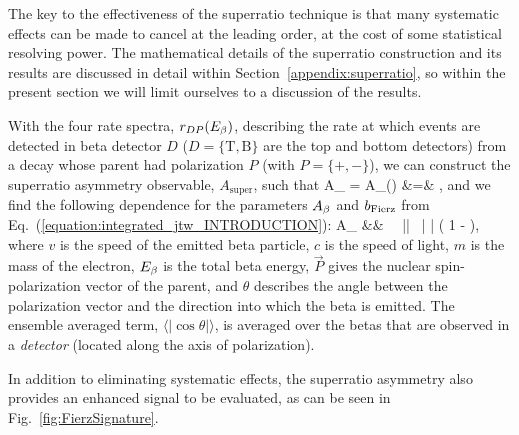 The key to the effectiveness of the superratio technique is that many systematic effects can be made to cancel at the leading order, at the cost of some statistical resolving power.  The mathematical details of the superratio construction and its results are discussed in detail within Section~\ref{appendix:superratio}, so within the present section we will limit ourselves to a discussion of the results.


With the four rate spectra, $r_{D P}(E_{\beta})$, describing the rate at which events are detected in beta detector $D$ ($D =\{ \mathrm{T, B}  \}$ are the top and bottom detectors) from a decay whose parent had polarization $P$ (with $P=\{+,-\}$), we can construct the superratio asymmetry observable, $A_{\mathrm{super}}$, such that
\bea
A_{} \;\;=\;\; A_{}(\Ebeta) 
&=& ,
\eea
and we find the following dependence for the parameters $A_{\beta}$ and $b_{\mathrm{Fierz}}$ from Eq.~(\ref{equation:integrated_jtw_INTRODUCTION}):
\bea
A_{} &\approx& \Abeta \,  \, || \, \langle | \cos\theta | \rangle \left( 1 - \bFierz {} \right), 
\eea
where $v$ is the speed of the emitted beta particle, $c$ is the speed of light, $m$ is the mass of the electron, $E_{\beta}$ is the total beta energy, $\vec{P}$ gives the nuclear spin-polarization vector of the parent, and $\theta$ describes the angle between the polarization vector and the direction into which the beta is emitted.  The ensemble averaged term, $\langle | \cos\theta | \rangle$, is averaged over the betas that are observed in a \emph{detector} (located along the axis of polarization).

In addition to eliminating systematic effects, the superratio asymmetry also provides an enhanced signal to be evaluated, as can be seen in Fig.~\ref{fig:FierzSignature}.

